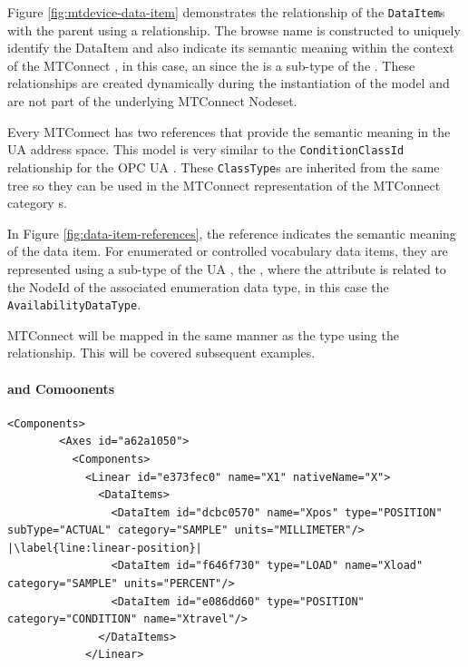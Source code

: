 

Figure \ref{fig:mtdevice-data-item} demonstrates the relationship of the \texttt{Data\-Item}s with the parent  using a  relationship. The browse name is constructed to uniquely identify the DataItem and also indicate its semantic meaning within the context of the MTConnect , in this case, an  since the  is a sub-type of the . These relationships are created dynamically during the instantiation of the model and are not part of the underlying MTConnect Nodeset.

Every MTConnect  has two references that provide the semantic meaning in the UA address space. This model is very similar to the \texttt{Condition\-Class\-Id} relationship for the OPC UA . These \texttt{Class\-Type}s are inherited from the same tree so they can be used in the MTConnect representation of the MTConnect  category s.



In Figure \ref{fig:data-item-references}, the  reference indicates the semantic meaning of the data item. For enumerated or controlled vocabulary data items, they are represented using a sub-type of the UA , the , where the  attribute is related to the NodeId of the associated enumeration data type, in this case the \texttt{Availability\-Data\-Type}.

MTConnect  will be mapped in the same manner as the type using the  relationship. This will be covered subsequent examples.

\FloatBarrier

\paragraph{ and  Comoonents}

\begin{lstlisting}[firstnumber=last,escapechar=|,%
    caption={Components and Conditions},label={lst:linear-x-component}]
      <Components>
        <Axes id="a62a1050">
          <Components>
            <Linear id="e373fec0" name="X1" nativeName="X">
              <DataItems>
                <DataItem id="dcbc0570" name="Xpos" type="POSITION" subType="ACTUAL" category="SAMPLE" units="MILLIMETER"/> |\label{line:linear-position}|
                <DataItem id="f646f730" type="LOAD" name="Xload" category="SAMPLE" units="PERCENT"/>
                <DataItem id="e086dd60" type="POSITION" category="CONDITION" name="Xtravel"/>
              </DataItems>
            </Linear>
\end{lstlisting}

